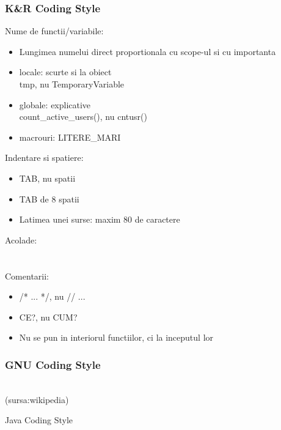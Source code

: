 \documentclass{beamer}
\begin{document}
  \begin{frame}[allowframebreaks]
  \frametitle{K\&R Coding Style}
  Nume de functii/variabile:\vspace{0.5cm}
  \begin{itemize}
  \item Lungimea numelui direct proportionala cu scope-ul si cu importanta
  \item locale: scurte si la obiect\\tmp, nu TemporaryVariable
  \item globale: explicative\\count\_active\_users(), nu cntusr()
  \item macrouri: LITERE\_MARI
  \end{itemize}
  \framebreak
  Indentare si spatiere:\vspace{0.5cm}
  \begin{itemize}
  \item TAB, nu spatii
  \item TAB de 8 spatii
  \item Latimea unei surse: maxim 80 de caractere
  \end{itemize}
  \framebreak
  Acolade:\\ \vspace{0.5cm}  \\ \framebreak  \\
  \framebreak
  Comentarii:\\\vspace{0.5cm}
  \begin{itemize}
  \item {\ttfamily /*  ...  */}, nu {\ttfamily //  ...}
  \item CE?, nu CUM?
  \item Nu se pun in interiorul functiilor, ci la inceputul lor\\\vspace{0.2cm}
  \end{itemize}
  
  \end{frame}

  \begin{frame}[allowframebreaks]
  \frametitle{GNU Coding Style}
   \\ {\footnotesize  (sursa:wikipedia)}
  \end{frame}

  \begin{frame}{Java Coding Style}
  
  \end{frame}
\end{document}

